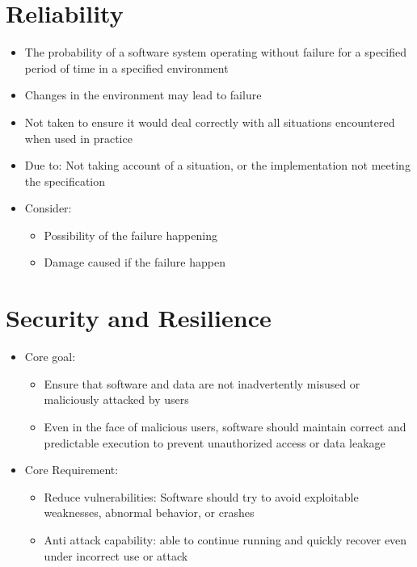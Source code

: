 \documentclass[12pt,openany]{book}
\begin{document}
\section{Reliability}
\begin{itemize}
    \item The probability of a software system operating without failure for a specified period of time in a specified environment
    \item Changes in the environment may lead to failure
    \item Not taken to ensure it would deal correctly with all situations encountered when used in practice
    \item Due to: Not taking account of a situation, or the implementation not meeting the specification
    \item Consider:
    \begin{itemize}
        \item Possibility of the failure happening
        \item Damage caused if the failure happen 
    \end{itemize}
\end{itemize}

\section{Security and Resilience}
\begin{itemize}
    \item Core goal:
    \begin{itemize}
        \item Ensure that software and data are not inadvertently misused or maliciously attacked by users
        \item Even in the face of malicious users, software should maintain correct and predictable execution to prevent unauthorized access or data leakage
    \end{itemize}
    \item Core Requirement:
    \begin{itemize}
        \item Reduce vulnerabilities: Software should try to avoid exploitable weaknesses, abnormal behavior, or crashes
        \item Anti attack capability: able to continue running and quickly recover even under incorrect use or attack
    \end{itemize}
\end{itemize}
\end{document}
